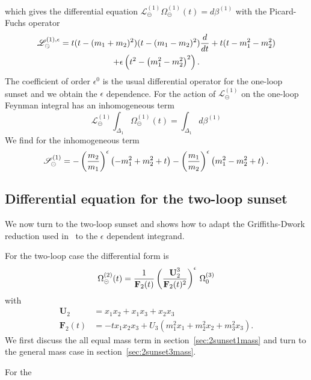 \documentclass[a4paper,12pt]{article}
\numberwithin{equation}{section}
\numberwithin{figure}{subsection}
\theoremstyle{plain}
\theoremstyle{plain}
\theoremstyle{definition}
\theoremstyle{plain}
\theoremstyle{remark}
\theoremstyle{plain}
\def\su{\circleddash}
\begin{document}
%
 which gives the differential equation $ \mathscr{L}_\su^{(1)}
 \Omega^{(1)}_\su(t) =d\beta^{(1)}$ with the Picard-Fuchs operator
 \begin{multline}\label{e:PF1loopresult}
\mathscr{L}_\su^{(1),\epsilon} =t
  (t-(m_1+m_2)^2)(t-(m_1-m_2)^2) {d\over dt}+t(t-m_{1}^2-m_{2}^2)\cr+\epsilon \left(t^2-\left(m_{1}^2-m_{2}^2\right)^2\right).
\end{multline}
The coefficient of order $\epsilon^0$ is the usual differential
operator for the one-loop sunset and we obtain the
$\epsilon$ dependence.
For the action of $ \mathscr{L}_\su^{(1)}$ on the one-loop Feynman
integral has an inhomogeneous term 
% 
\begin{equation}
  \mathscr{L}_\su^{(1)}  \int_{\Delta_1} \Omega_\su^{(1)}(t)=\int_{\Delta_1} d\beta^{(1)}
\end{equation}
We find for the inhomogeneous term
\begin{equation}
  \mathscr{S}_\su^{(1)}=- \left(m_{2}\over m_1\right)^{\epsilon }
   \left(-m_{1}^2+m_{2}^2+t\right)-\left(m_{1}\over m_2\right)^{\epsilon } 
   \left(m_{1}^2-m_{2}^2+t\right)  .
\end{equation}



\subsection{Differential equation for the  two-loop sunset}
\label{sec:two-loop-case}
We now turn to the two-loop sunset and shows how to adapt the
Griffiths-Dwork reduction used in~\cite{Bloch:2016izu,Lairez:2022zkj} to the $\epsilon$
dependent integrand.


For the two-loop case the differential form is
\begin{equation}\label{e:OmegaSunset}
  \Omega_\su^{(2)}(t)={1\over
    \textbf{F}_2(t)}\left(\textbf{U}_2^3\over \textbf{F}_2(t)^2\right)^\epsilon  \,\Omega_0^{(3)}
\end{equation}
with
\begin{align}
 \textbf{U}_2&=x_1x_2+x_1x_3+x_2x_3\\
  \textbf{F}_2(t)&=-tx_1x_2x_3 +U_3 (m_1^2x_1+m_2^2x_2+m_3^2x_3).
\end{align}
We first discuss the all equal mass term in
section~\ref{sec:2sunset1mass} and turn to the general mass case in section~\ref{sec:2sunset3mass}.


For the 
\end{document}
